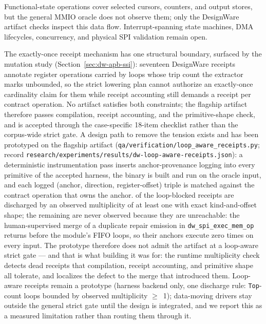 Functional-state operations cover selected cursors, counters, and output stores,
but the general MMIO oracle does not observe them; only the DesignWare artifact
checks inspect this data flow. Interrupt-spanning state machines, DMA
lifecycles, concurrency, and physical SPI validation remain open.

The exactly-once receipt mechanism has one structural boundary, surfaced by
the mutation study (Section~\ref{sec:dw-apb-ssi}): seventeen DesignWare
receipts annotate register operations carried by loops whose trip count the
extractor marks unbounded, so the strict lowering plan cannot authorize an
exactly-once cardinality claim for them while receipt accounting still
demands a receipt per contract operation. No artifact satisfies both
constraints; the flagship artifact therefore passes compilation, receipt
accounting, and the primitive-shape check, and is accepted through the
case-specific 18-item checklist rather than the corpus-wide strict gate.
A design path to remove the tension exists and has been prototyped on the
flagship artifact (\texttt{qa/verification/loop\_aware\_receipts.py}; record
\texttt{research/experiments/results/dw-loop-aware-receipts.json}): a
deterministic instrumentation pass inserts anchor-provenance logging into
every primitive of the accepted harness, the binary is built and run on the
oracle input, and each logged (anchor, direction, register-offset) triple is
matched against the contract operation that owns the anchor.
\LoopAwareDischarged{} of the
\LoopAwareBlocked{} loop-blocked receipts are discharged by an observed multiplicity
of at least one with exact kind-and-offset shape; the remaining
\LoopAwareUnobserved{} are
never observed because they are unreachable: the human-supervised merge of
a duplicate repair emission in \texttt{dw\_spi\_exec\_mem\_op} returns
before the module's FIFO loops, so their anchors execute zero times on
every input. The prototype therefore does not admit the artifact at a
loop-aware strict gate --- and that is what building it was for: the runtime
multiplicity check detects dead receipts that compilation, receipt
accounting, and primitive shape all tolerate, and localizes the defect to
the merge that introduced them. Loop-aware receipts remain a prototype
(harness backend only, one discharge rule: \texttt{Top}-count loops bounded
by observed multiplicity $\geq$~1); data-moving drivers stay outside the
general strict gate until the design is integrated, and we report this as a
measured limitation rather than routing them through it.

